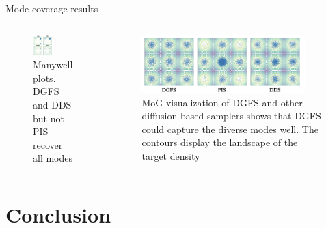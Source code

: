 \documentclass[aspectratio=169,xcolor=dvipsnames]{beamer}
\begin{document}
\begin{frame}[t]{Mode coverage results}

\begin{columns}[t]
\begin{column}{0.48\textwidth}
\begin{figure}
    \centering
    \includegraphics[width=0.5\textwidth]{figures/mode.png}
    \caption{Manywell plots. DGFS and DDS but not PIS recover all modes}
\end{figure}
\end{column}
\begin{column}{0.48\textwidth}
\begin{figure}
    \centering
    \includegraphics[width=0.9\textwidth]{figures/MoG.png}
    \caption{MoG visualization of DGFS and other diffusion-based samplers shows that DGFS could capture the diverse modes well. The contours display the landscape of the target density}
\end{figure}
\end{column}
\end{columns}
    
\end{frame}

\section{Conclusion}
\end{document}
